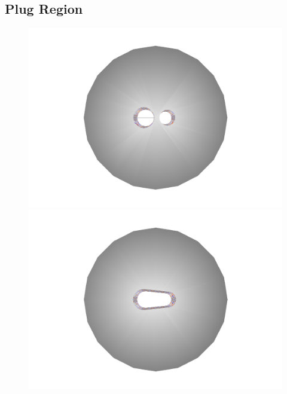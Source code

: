 \documentclass{report}
\begin{document}
            \subsection{Plug Region}
                \begin{figure}[h]
                    \centering
                    \begin{minipage}{0.3\textwidth}
                        \includegraphics[width=\textwidth]{beamcal_plug}
                    \end{minipage}
                    \begin{minipage}{0.3\textwidth}
                        \includegraphics[width=\textwidth]{beamcal_wedge}
                    \end{minipage}
                    \begin{minipage}{0.3\textwidth}

\end{minipage}
\end{figure}
\end{document}
